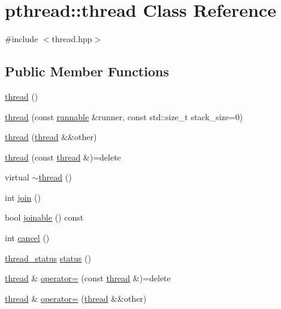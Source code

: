 \hypertarget{classpthread_1_1thread}{\section{pthread\+:\+:thread Class Reference}
\label{classpthread_1_1thread}
}


{\ttfamily \#include $<$thread.\+hpp$>$}

\subsection*{Public Member Functions}
\begin{DoxyCompactItemize}
\item 
\hyperlink{classpthread_1_1thread_a60ac91ccf3de6e36258aa741af015095}{thread} ()
\item 
\hyperlink{classpthread_1_1thread_aaf360cff96e50499872bd147e85ba3ac}{thread} (const \hyperlink{classpthread_1_1runnable}{runnable} \&runner, const std\+::size\+\_\+t stack\+\_\+size=0)
\item 
\hyperlink{classpthread_1_1thread_a928b41a7587eba3e5e39237b4b2f655a}{thread} (\hyperlink{classpthread_1_1thread}{thread} \&\&other)
\item 
\hyperlink{classpthread_1_1thread_ab9ddf5aa6697287269dc2804051b6378}{thread} (const \hyperlink{classpthread_1_1thread}{thread} \&)=delete
\item 
virtual \hyperlink{classpthread_1_1thread_aa4920e15c3a033f94c6be462c5cbcecf}{$\sim$thread} ()
\item 
int \hyperlink{classpthread_1_1thread_a93c4105becf4dea1b00efb30cd7228af}{join} ()
\item 
bool \hyperlink{classpthread_1_1thread_a14b07d05a78157bcb5ee42fc8dd17e35}{joinable} () const 
\item 
int \hyperlink{classpthread_1_1thread_a89b64810871feee5c2d2659f3ae2f668}{cancel} ()
\item 
\hyperlink{namespacepthread_ac4b6e78f3d72c946ace7a92f3bec4101}{thread\+\_\+status} \hyperlink{classpthread_1_1thread_a3e49c7d73cb8411258790ed2fc0cd818}{status} ()
\item 
\hyperlink{classpthread_1_1thread}{thread} \& \hyperlink{classpthread_1_1thread_a09903f6b3f396f2ea046c9c1606f0f61}{operator=} (const \hyperlink{classpthread_1_1thread}{thread} \&)=delete
\item 
\hyperlink{classpthread_1_1thread}{thread} \& \hyperlink{classpthread_1_1thread_a8f9ab7d43ad9aee0368ccc4778cf40d0}{operator=} (\hyperlink{classpthread_1_1thread}{thread} \&\&other)
\end{DoxyCompactItemize}


